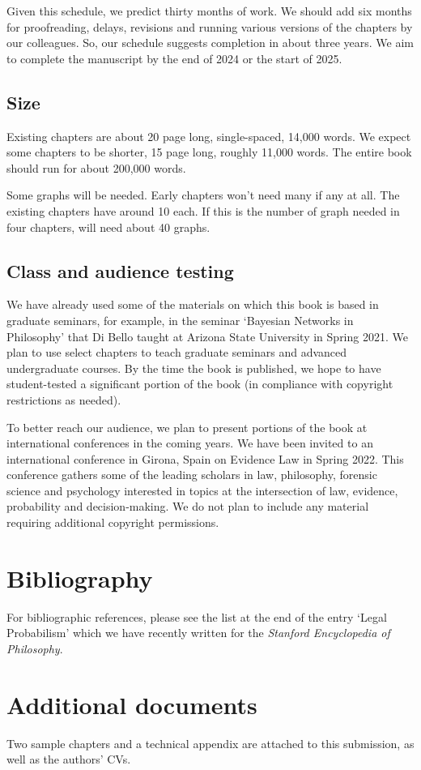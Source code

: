 \documentclass[
  10pt,
  dvipsnames,enabledeprecatedfontcommands]{scrartcl}
\begin{document}
Given this schedule, we predict thirty months of work. We should add six
months for proofreading, delays, revisions and running various versions
of the chapters by our colleagues. So, our schedule suggests completion
in about three years. We aim to complete the manuscript by the end of
2024 or the start of 2025.

\hypertarget{size}{%
\subsection{Size}\label{size}}

Existing chapters are about 20 page long, single-spaced, 14,000 words.
We expect some chapters to be shorter, 15 page long, roughly 11,000
words. The entire book should run for about 200,000 words.

Some graphs will be needed. Early chapters won't need many if any at
all. The existing chapters have around 10 each. If this is the number of
graph needed in four chapters, will need about 40 graphs.

\hypertarget{class-and-audience-testing}{%
\subsection{Class and audience
testing}\label{class-and-audience-testing}}

We have already used some of the materials on which this book is based
in graduate seminars, for example, in the seminar `Bayesian Networks in
Philosophy' that Di Bello taught at Arizona State University in Spring
2021. We plan to use select chapters to teach graduate seminars and
advanced undergraduate courses. By the time the book is published, we
hope to have student-tested a significant portion of the book (in
compliance with copyright restrictions as needed).

To better reach our audience, we plan to present portions of the book at
international conferences in the coming years. We have been invited to
an international conference in Girona, Spain on Evidence Law in Spring
2022. This conference gathers some of the leading scholars in law,
philosophy, forensic science and psychology interested in topics at the
intersection of law, evidence, probability and decision-making. We do
not plan to include any material requiring additional copyright
permissions.

\hypertarget{bibliography}{%
\section{Bibliography}\label{bibliography}}

For bibliographic references, please see the list at the end of the
entry `Legal Probabilism' which we have recently written for the
\textit{Stanford Encyclopedia of Philosophy}.

\hypertarget{additional-documents}{%
\section{Additional documents}\label{additional-documents}}

Two sample chapters and a technical appendix are attached to this
submission, as well as the authors' CVs.
\end{document}
